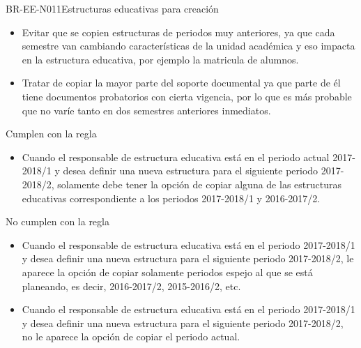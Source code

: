\begin{BusinessRule}{BR-EE-N011}{Estructuras educativas para creación}
	\BRItem[Motivación] \cdtEmpty
		\begin{itemize}
			\item Evitar que se copien estructuras de periodos muy anteriores, ya que cada semestre van cambiando características de la unidad académica y eso impacta en la estructura educativa, por ejemplo la matricula de alumnos.
			\item Tratar de copiar la mayor parte del soporte documental ya que parte de él tiene documentos probatorios con cierta vigencia,  por lo que es más probable que no varíe tanto en dos semestres anteriores inmediatos.
		\end{itemize}
		 Cumplen con la regla
		\begin{itemize}
			\item Cuando el responsable de estructura educativa está en el periodo actual 2017-2018/1 y desea definir una nueva estructura para el siguiente periodo 2017-2018/2, solamente debe tener la opción de copiar alguna de las estructuras educativas correspondiente a los periodos 2017-2018/1 y 2016-2017/2.
		\end{itemize}
		 No cumplen con la regla
		\begin{itemize}
			\item Cuando el responsable de estructura educativa está en el periodo 2017-2018/1 y desea definir una nueva estructura para el siguiente periodo 2017-2018/2, le aparece la opción de copiar solamente periodos espejo al que se está planeando, es decir, 2016-2017/2, 2015-2016/2, etc.
			\item Cuando el responsable de estructura educativa está en el periodo 2017-2018/1 y desea definir una nueva estructura para el siguiente periodo 2017-2018/2, no le aparece la opción de copiar el periodo actual.
		\end{itemize}
\end{BusinessRule}

